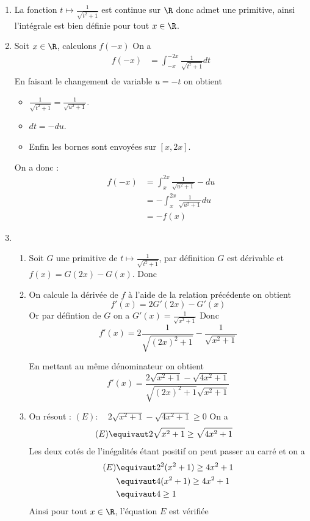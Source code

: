 \documentclass[a4paper, 11pt,reqno]{article}
\begin{document}
\begin{correction}
\begin{enumerate}
\item La fonction $t\mapsto \frac{1}{\sqrt{t^2+1}}$ est continue sur $\R$ donc admet une primitive, ainsi l'intégrale est bien définie pour tout $x\in \R$.
\item Soit $x\in \R$, calculons $f(-x)$ 
On a 
\begin{align*}
f(-x) &= \int_{-x}^{-2x} \frac{1}{\sqrt{t^2+1}} dt\\
\end{align*}
En faisant le changement de variable $u=-t$ on obtient 
\begin{itemize}
\item $\frac{1}{\sqrt{t^2+1}} = \frac{1}{\sqrt{u^2+1}} $.
\item $ dt=-du$.
\item Enfin les bornes sont envoyées sur $[x,2x]$.
\end{itemize}
On a donc : 
\begin{align*}
f(-x) &= \int_{x}^{2x} \frac{1}{\sqrt{u^2+1}}-du\\
	&= -\int_{x}^{2x} \frac{1}{\sqrt{u^2+1}}du\\
	&=-f(x)
\end{align*}
\item 
\begin{enumerate}


\item Soit $G$ une primitive de $t\mapsto \frac{1}{\sqrt{t^2+1}}$, par définition $G$ est dérivable et $f(x) =G(2x) -G(x)$. Donc 
\item On calcule la dérivée de $f$ à l'aide de la relation précédente on obtient 
$$f'(x) =2 G'(2x)-G'(x)$$
Or par défintion de $G$ on a  $G'(x)= \frac{1}{\sqrt{x^2+1}}$
Donc 
$$f'(x)= 2  \frac{1}{\sqrt{(2x)^2+1}}- \frac{1}{\sqrt{x^2+1}}$$

En mettant au même dénominateur on obtient 
$$f'(x) = \frac{2\sqrt{x^2+1} -\sqrt{4x^2+1} }{\sqrt{(2x)^2+1}\sqrt{x^2+1}}$$



\item On résout : 
$(E) : \quad 2\sqrt{x^2+1} -\sqrt{4x^2+1}\geq 0$
On a 
\begin{align*}
(E)& \equivaut  2\sqrt{x^2+1}  \geq \sqrt{4x^2+1}
\end{align*}
Les deux cotés de l'inégalités étant positif on peut passer au carré et on a 
\begin{align*}
(E)& \equivaut  2^2(x^2+1)  \geq 4x^2+1\\
& \equivaut  4(x^2+1)  \geq 4x^2+1\\
& \equivaut  4 \geq 1
\end{align*}
Ainsi pour tout $x\in \R$, l'équation $E$ est vérifiée



\end{enumerate}
\end{enumerate}
\end{correction}
\end{document}
